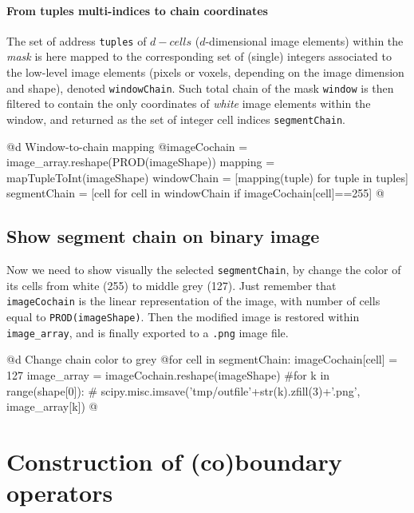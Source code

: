 \documentclass[11pt,oneside]{article}	%
\begin{document}
\paragraph{From tuples multi-indices to chain coordinates}

The set of address \texttt{tuples} of $d-cells$ ($d$-dimensional image elements) within the \emph{mask} is here mapped to the corresponding set of (single) integers associated to the low-level image elements (pixels or voxels, depending on the image dimension and shape), denoted \texttt{windowChain}. Such total chain of the mask \texttt{window} is then filtered to contain the only coordinates of \emph{white} image elements within the window, and returned as the set of integer cell indices \texttt{segmentChain}.


@d Window-to-chain mapping
@{imageCochain = image_array.reshape(PROD(imageShape))
mapping = mapTupleToInt(imageShape)
windowChain = [mapping(tuple) for tuple in tuples]
segmentChain = [cell for cell in windowChain if imageCochain[cell]==255]
@}

\subsection{Show segment chain on binary image}

Now we need to show visually the selected \texttt{segmentChain}, by change the color of its cells from white (255) to middle grey (127). Just remember that \texttt{imageCochain} is the linear representation of the image, with number of cells equal to \texttt{PROD(imageShape)}. Then the modified image is restored within \texttt{image\_array}, and is finally exported to a \texttt{.png} image file.

@d Change chain color to grey
@{for cell in segmentChain: imageCochain[cell] = 127
image_array = imageCochain.reshape(imageShape)
#for k in range(shape[0]):
#	scipy.misc.imsave('tmp/outfile'+str(k).zfill(3)+'.png', image_array[k])
@}


\section{Construction of (co)boundary operators}
\end{document}
